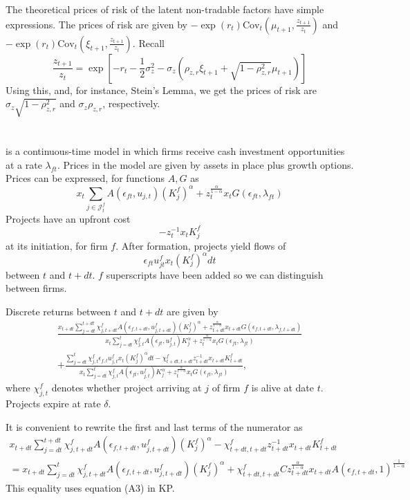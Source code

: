 The theoretical prices of risk of the latent non-tradable factors have simple expressions. The prices of risk are given by $-\exp(r_t) \text{Cov}_t(\mu_{t+1}, \frac{z_{t+1}}{z_t})$ and $-\exp(r_t) \text{Cov}_t(\xi_{t+1}, \frac{z_{t+1}}{z_t}).$ Recall \[
\frac{z_{t+1}}{z_t} = \exp[-r_t - \frac{1}{2} \sigma_z^2 - \sigma_z (\rho_{z, r} \xi_{t+1} + \sqrt{1 - \rho_{z, r}^2} \mu_{t+1})]
\]
Using this, and, for instance, Stein's Lemma, we get the prices of risk are $\sigma_z \sqrt{1 -\rho_{z, r}^2} $ and $\sigma_z \rho_{z, r}$, respectively.


\section{\cite{kp_2014}}

\cite{kp_2014} is a continuous-time model in which firms receive cash investment opportunities at a rate $\lambda_{ft}$. Prices in the model are given by assets in place plus growth options. Prices can be expressed, for functions $A, G$ as \[
x_t \sum_{ j \in \mathcal J_t^f} A(\epsilon_{ft}, u_{j, t}) (K_j^f)^{\alpha} + z_t^{\frac{\alpha}{1 - \alpha}} x_t G(\epsilon_{ft}, \lambda_{ft})
\]
Projects have an upfront cost \[
- z_t^{-1} x_t K_j^f
\]
at its initiation, for firm $f$. After formation, projects yield flows of \[
\epsilon_{ft} u_{jt}^f x_t (K_j^f)^{\alpha} dt
\]
between $t$ and $t+dt$. $f$ superscripts have been added so we can distinguish between firms.

Discrete returns between $t$ and $t+dt$ are given by 
\begin{multline*}
\frac{x_{t+dt} \sum_{ j = dt}^{t+dt} \chi_{j, t+dt}^f A(\epsilon_{f,t+dt}, u_{j, t+dt}^f)( K_j^f)^{\alpha} + z_{t+dt}^{\frac{\alpha}{1 - \alpha}} x_{t+dt} G(\epsilon_{f,t+dt}, \lambda_{f,t+dt})}{x_t \sum_{ j = dt}^t \chi_{j, t}^f  A(\epsilon_{ft}, u_{j, t}^f) K_j^{\alpha} + z_t^{\frac{\alpha}{1 - \alpha}} x_t G(\epsilon_{ft}, \lambda_{ft})}  \\
+ \frac{\sum_{j = dt}^t\chi_{j, t}^f \epsilon_{f,t} u_{j,t}^f x_{t} (K_j^f)^{\alpha} dt - \chi_{t+dt, t+dt}^fz_{t+dt}^{-1} x_{t+dt} K_{t+dt}^f}{x_t \sum_{ j = dt}^t \chi_{j, t}^f  A(\epsilon_{ft}, u_{j, t}^f) K_j^{\alpha} + z_t^{\frac{\alpha}{1 - \alpha}} x_t G(\epsilon_{ft}, \lambda_{ft})},
\end{multline*}
where $\chi_{j, t}^f$ denotes whether project arriving at $j$ of firm $f$ is alive at date $t$. Projects expire at rate $\delta.$

It is convenient to rewrite the first and last terms of the numerator as
\begin{multline*}
x_{t+dt} \sum_{ j = dt}^{t+dt} \chi_{j, t+dt}^f A(\epsilon_{f,t+dt}, u_{j, t+dt}^f)( K_j^f)^{\alpha} - \chi_{t+dt, t+dt}^fz_{t+dt}^{-1} x_{t+dt} K_{t+dt}^f \\
= x_{t+dt} \sum_{ j = dt}^{t} \chi_{j, t+dt}^f A(\epsilon_{f,t+dt}, u_{j, t+dt}^f)( K_j^f)^{\alpha} + \chi_{t+dt, t+dt}^f C z_{t+dt}^{\frac{\alpha}{1 - \alpha}} x_{t+dt} A(\epsilon_{f, t+dt}, 1)^{\frac{1}{1 - \alpha}}
\end{multline*}
This equality uses equation (A3) in KP. 

